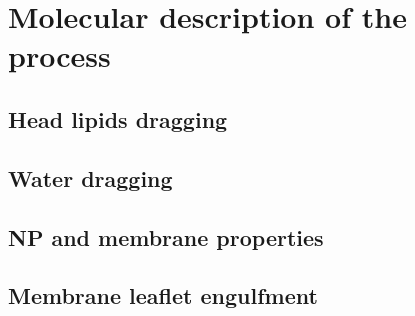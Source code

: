 \chapter{Molecular description of the process}

\section{Head lipids dragging}

\section{Water dragging}

\section{NP and membrane properties}

\section{Membrane leaflet engulfment}
